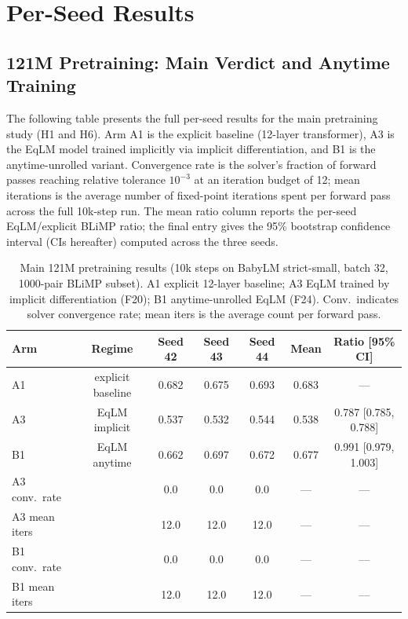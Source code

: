 
\section{Per-Seed Results}

\subsection{121M Pretraining: Main Verdict and Anytime Training}

The following table presents the full per-seed results for the main pretraining study (H1 and H6). Arm A1 is the explicit baseline (12-layer transformer), A3 is the EqLM model trained implicitly via implicit differentiation, and B1 is the anytime-unrolled variant. Convergence rate is the solver's fraction of forward passes reaching relative tolerance $10^{-3}$ at an iteration budget of 12; mean iterations is the average number of fixed-point iterations spent per forward pass across the full 10k-step run. The mean ratio column reports the per-seed EqLM/explicit BLiMP ratio; the final entry gives the 95\% bootstrap confidence interval (CIs hereafter) computed across the three seeds.

\begin{table}[h]
\centering
\small
\caption{Main 121M pretraining results (10k steps on BabyLM strict-small, batch 32, 1000-pair BLiMP subset). A1 explicit 12-layer baseline; A3 EqLM trained by implicit differentiation (F20); B1 anytime-unrolled EqLM (F24). Conv.\ indicates solver convergence rate; mean iters is the average count per forward pass.}
\label{tab:pretraining_main}
\begin{tabular}{@{}lcccccc@{}}
\toprule
Arm & Regime & Seed 42 & Seed 43 & Seed 44 & Mean & Ratio [95\% CI] \\
\midrule
A1 & explicit baseline & 0.682 & 0.675 & 0.693 & 0.683 & --- \\
A3 & EqLM implicit & 0.537 & 0.532 & 0.544 & 0.538 & 0.787 [0.785, 0.788] \\
B1 & EqLM anytime & 0.662 & 0.697 & 0.672 & 0.677 & 0.991 [0.979, 1.003] \\
\midrule
A3 conv.\ rate & & 0.0 & 0.0 & 0.0 & --- & --- \\
A3 mean iters & & 12.0 & 12.0 & 12.0 & --- & --- \\
B1 conv.\ rate & & 0.0 & 0.0 & 0.0 & --- & --- \\
B1 mean iters & & 12.0 & 12.0 & 12.0 & --- & --- \\
\bottomrule
\end{tabular}
\end{table}

